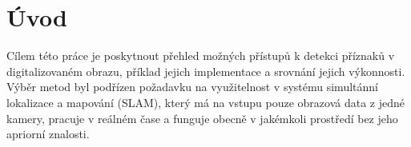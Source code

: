 

\chapter{Úvod}

Cílem této práce je poskytnout přehled možných přístupů k detekci příznaků v digitalizovaném obrazu, příklad jejich implementace a srovnání jejich výkonnosti. Výběr metod byl podřízen požadavku na využitelnost v systému simultánní lokalizace a mapování (SLAM), který má na vstupu pouze obrazová data z jedné kamery, pracuje v reálném čase a funguje obecně v jakémkoli prostředí bez jeho apriorní znalosti.